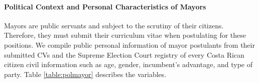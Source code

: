 \paragraph{Political Context and Personal Characteristics of Mayors}
Mayors are public servants and subject to the scrutiny of their citizens. Therefore, they must submit their curriculum vitae when postulating for these positions. We compile public personal information of mayor postulants from their submitted CVs and the Supreme Election Court registry of every Costa Rican citizen civil information such as age, gender, incumbent's advantage, and type of party. Table \ref{table:polmayor} describes the variables. 


